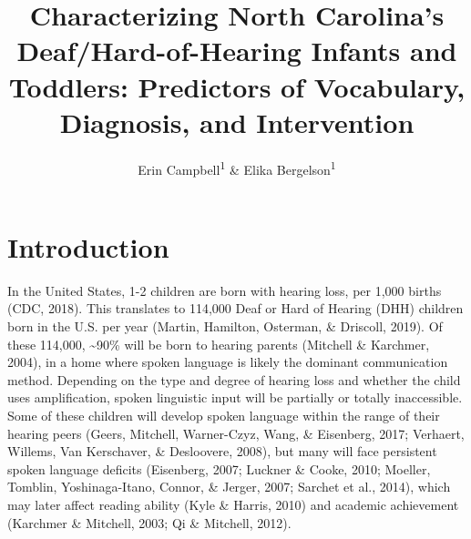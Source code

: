 \documentclass[english,man]{apa6}
\title{Characterizing North Carolina's Deaf/Hard-of-Hearing Infants and Toddlers: Predictors of Vocabulary, Diagnosis, and Intervention}
\author{Erin Campbell\textsuperscript{1} \& Elika Bergelson\textsuperscript{1}}
\date{}
\affiliation{\vspace{0.5cm}\textsuperscript{1} Duke University}
\begin{document}
\maketitle

\hypertarget{introduction}{%
\section{Introduction}\label{introduction}}

In the United States, 1-2 children are born with hearing loss, per 1,000 births (CDC, 2018). This translates to 114,000 Deaf or Hard of Hearing (DHH) children born in the U.S. per year (Martin, Hamilton, Osterman, \& Driscoll, 2019). Of these 114,000, \textasciitilde{}90\% will be born to hearing parents (Mitchell \& Karchmer, 2004), in a home where spoken language is likely the dominant communication method. Depending on the type and degree of hearing loss and whether the child uses amplification, spoken linguistic input will be partially or totally inaccessible. Some of these children will develop spoken language within the range of their hearing peers (Geers, Mitchell, Warner-Czyz, Wang, \& Eisenberg, 2017; Verhaert, Willems, Van Kerschaver, \& Desloovere, 2008), but many will face persistent spoken language deficits (Eisenberg, 2007; Luckner \& Cooke, 2010; Moeller, Tomblin, Yoshinaga-Itano, Connor, \& Jerger, 2007; Sarchet et al., 2014), which may later affect reading ability (Kyle \& Harris, 2010) and academic achievement (Karchmer \& Mitchell, 2003; Qi \& Mitchell, 2012).
\end{document}
